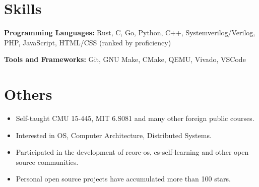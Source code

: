 \documentclass{resume}
\begin{document}




\section{Skills}
\textbf{Programming Languages:} \small Rust, C, Go, Python, C++, Systemverilog/Verilog, PHP, JavaScript, HTML/CSS (ranked by proficiency)

\textbf{Tools and Frameworks:} \small Git, GNU Make, CMake, QEMU, Vivado, VSCode

\section{Others}
\begin{itemize}
  \item Self-taught CMU 15-445, MIT 6.S081 and many other foreign public courses.
  \item Interested in OS, Computer Architecture, Distributed Systems.
  \item Participated in the development of rcore-os, cs-self-learning and other open source communities.
  \item Personal open source projects have accumulated more than 100 stars.
\end{itemize}
\end{document}

